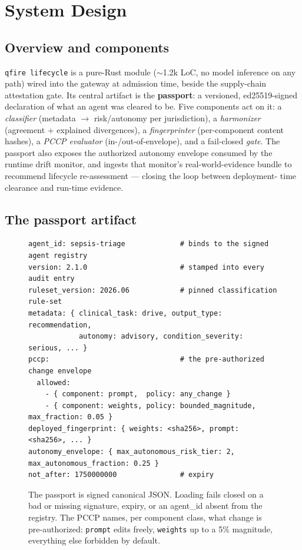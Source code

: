 \documentclass[11pt]{article}
\begin{document}
\section{System Design}
\subsection{Overview and components}
\texttt{qfire lifecycle} is a pure-Rust module ($\sim$1.2k LoC, no model inference on
any path) wired into the gateway at admission time, beside the supply-chain
attestation gate. Its central artifact is the \textbf{passport}: a versioned,
ed25519-signed declaration of what an agent was cleared to be. Five components act on
it: a \emph{classifier} (metadata $\rightarrow$ risk/autonomy per jurisdiction), a
\emph{harmonizer} (agreement + explained divergences), a \emph{fingerprinter}
(per-component content hashes), a \emph{PCCP evaluator} (in-/out-of-envelope), and a
fail-closed \emph{gate}. The passport also exposes the authorized autonomy envelope
consumed by the runtime drift monitor, and ingests that monitor's real-world-evidence
bundle to recommend lifecycle re-assessment --- closing the loop between deployment-
time clearance and run-time evidence.

\subsection{The passport artifact}\label{sec:language}
\begin{figure}[htb]\centering
\begin{tcolorbox}[policycard, cardcol=cardblue, title=A regulatory passport (abridged),
  width=0.86\linewidth]
\begin{lstlisting}[style=housespecyamlbare]
agent_id: sepsis-triage             # binds to the signed agent registry
version: 2.1.0                      # stamped into every audit entry
ruleset_version: 2026.06            # pinned classification rule-set
metadata: { clinical_task: drive, output_type: recommendation,
            autonomy: advisory, condition_severity: serious, ... }
pccp:                               # the pre-authorized change envelope
  allowed:
    - { component: prompt,  policy: any_change }
    - { component: weights, policy: bounded_magnitude, max_fraction: 0.05 }
deployed_fingerprint: { weights: <sha256>, prompt: <sha256>, ... }
autonomy_envelope: { max_autonomous_risk_tier: 2, max_autonomous_fraction: 0.25 }
not_after: 1750000000               # expiry
\end{lstlisting}
\end{tcolorbox}
\caption{The passport is signed canonical JSON. Loading fails closed on a bad or
missing signature, expiry, or an agent\_id absent from the registry. The PCCP names,
per component class, what change is pre-authorized: \texttt{prompt} edits freely,
\texttt{weights} up to a 5\% magnitude, everything else forbidden by default.}
\label{fig:spec}
\end{figure}
\end{document}

